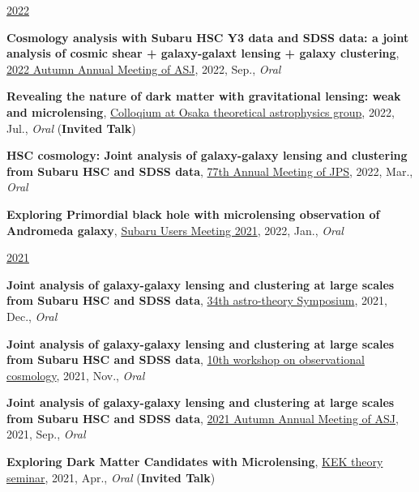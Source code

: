 \underline{2022}
\begin{etaremune}
\setcounter{enumi}{24}
\item \textbf{Cosmology analysis with Subaru HSC Y3 data and SDSS data: a joint analysis of cosmic shear + galaxy-galaxt lensing + galaxy clustering}, \href{https://www.asj.or.jp/nenkai/archive/2022b/pdf/U15a.pdf}{2022 Autumn Annual Meeting of ASJ}, 2022, Sep., \textit{Oral}
\item \textbf{Revealing the nature of dark matter with gravitational lensing: weak and microlensing}, \href{http://astro-osaka.jp/OUTAP/colloquium-abstracts.html#sugiyama}{Colloqium at Osaka theoretical astrophysics group}, 2022, Jul., \textit{Oral} (\textbf{Invited Talk})
\item \textbf{HSC cosmology: Joint analysis of galaxy-galaxy lensing and clustering from Subaru HSC and SDSS data}, \href{https://www.jps.or.jp/activities/meetings/annual/annual-index.php}{77th Annual Meeting of JPS}, 2022, Mar., \textit{Oral}
\item \textbf{Exploring Primordial black hole with microlensing observation of Andromeda galaxy}, \href{https://subarutelescope.org/Science/SubaruUM/SubaruUM2021/}{Subaru Users Meeting 2021}, 2022, Jan., \textit{Oral}
\end{etaremune}

\underline{2021}
\begin{etaremune}
\setcounter{enumi}{20}
\item \textbf{Joint analysis of galaxy-galaxy lensing and clustering at large scales from Subaru HSC and SDSS data}, \href{https://sites.google.com/view/rironkon2021/}{34th astro-theory Symposium}, 2021, Dec., \textit{Oral}
\item \textbf{Joint analysis of galaxy-galaxy lensing and clustering at large scales from Subaru HSC and SDSS data}, \href{https://sites.google.com/view/obscosmws2021main}{10th workshop on observational cosmology}, 2021, Nov., \textit{Oral}
\item \textbf{Joint analysis of galaxy-galaxy lensing and clustering at large scales from Subaru HSC and SDSS data}, \href{https://www.asj.or.jp/nenkai/archive/2021b/pdf/U05a.pdf}{2021 Autumn Annual Meeting of ASJ}, 2021, Sep., \textit{Oral}
\item \textbf{Exploring Dark Matter Candidates with Microlensing}, \href{https://www.kek.jp/ja/conference/20210407-3/}{KEK theory seminar}, 2021, Apr., \textit{Oral} (\textbf{Invited Talk})
\end{etaremune}

